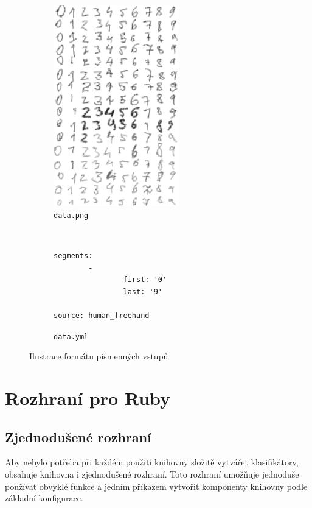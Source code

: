 \documentclass[a4paper]{article}
\begin{document}
\begin{figure}[h]
        \centering
        \begin{subfigure}[b]{0.5\textwidth}
		\centering
                \includegraphics[width=0.6\textwidth]{letter_dataset_sample}
		\caption{\texttt{data.png}}
        \end{subfigure}%
        ~ %
        \begin{subfigure}[b]{0.5\textwidth}
\begin{lstlisting}
segments:
        -
                first: '0'
                last: '9'

source: human_freehand
\end{lstlisting}
		\caption{\texttt{data.yml}}
        \end{subfigure}
        \caption{Ilustrace formátu písmenných vstupů}
\end{figure}

\section{Rozhraní pro Ruby}

\subsection{Zjednodušené rozhraní}
Aby nebylo potřeba při každém použití knihovny složitě vytvářet klasifikátory,
obsahuje knihovna i zjednodušené rozhraní. Toto rozhraní umožňuje jednoduše
používat obvyklé funkce a jedním příkazem vytvořit komponenty knihovny podle
základní konfigurace.
\end{document}

